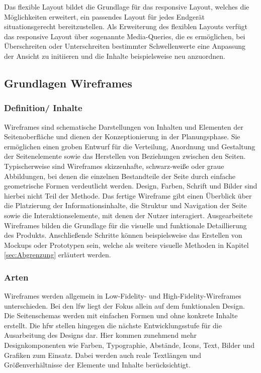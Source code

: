 Das flexible Layout bildet die Grundlage für das responsive Layout, welches die Möglichkeiten erweitert, ein passendes Layout für jedes Endgerät situationsgerecht bereitzustellen. Als Erweiterung des flexiblen Layouts verfügt das responsive Layout über sogenannte Media-Queries, die es ermöglichen, bei Überschreiten oder Unterschreiten bestimmter Schwellenwerte eine Anpassung der Ansicht zu initiieren und die Inhalte beispielsweise neu anzuordnen.

\subsection{Grundlagen Wireframes}
\label{sec:wireframes}

\subsubsection{Definition/ Inhalte}

Wireframes sind schematische Darstellungen von Inhalten und Elementen der Seitenoberfläche und dienen der Konzeptionierung in der Planungsphase. Sie ermöglichen einen groben Entwurf für die Verteilung, Anordnung und Gestaltung der Seitenelemente sowie das Herstellen von Beziehungen zwischen den Seiten.
Typischerweise sind Wireframes skizzenhafte, schwarz-weiße oder graue Abbildungen, bei denen die einzelnen Bestandteile der Seite durch einfache geometrische Formen verdeutlicht werden. Design, Farben, Schrift und Bilder sind hierbei nicht Teil der Methode. Das fertige Wireframe gibt einen Überblick über die Platzierung der Informationsinhalte, die Struktur und Navigation der Seite sowie die Interaktionselemente, mit denen der Nutzer interagiert.
Ausgearbeitete Wireframes bilden die Grundlage für die visuelle und funktionale Detaillierung des Produkts. Anschließende Schritte können beispielsweise das Erstellen von Mockups oder Prototypen sein, welche als weitere visuelle Methoden in Kapitel \ref{sec:Abgrenzung} erläutert werden.


\subsubsection{Arten}

Wireframes werden allgemein in Low-Fidelity- und High-Fidelity-Wireframes unterschieden. Bei den \acrfull{lfw} liegt der Fokus allein auf dem funktionalen Design. Die Seitenschemas werden mit einfachen Formen und ohne konkrete Inhalte erstellt. Die \acrfull{hfw} stellen hingegen die nächste Entwicklungsstufe für die Ausarbeitung des Designs dar. Hier kommen zunehmend mehr Designkomponenten wie Farben, Typographie, Abstände, Icons, Text, Bilder und Grafiken zum Einsatz. Dabei werden auch reale Textlängen und Größenverhältnisse der Elemente und Inhalte berücksichtigt.

